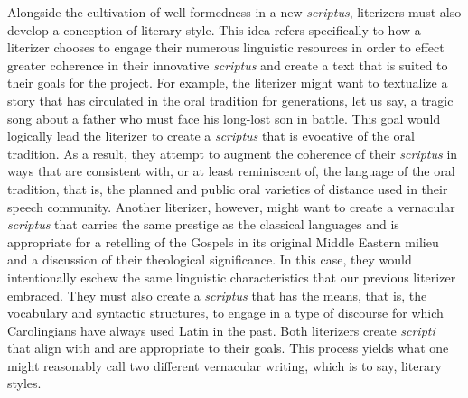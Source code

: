 Alongside the cultivation of well-formedness in a new \textit{scriptus}, literizers must also develop a conception of literary style. This idea refers specifically to how a literizer chooses to engage their numerous linguistic resources in order to effect greater coherence in their innovative \textit{scriptus} and create a text that is suited to their goals for the project. For example, the literizer might want to textualize a story that has circulated in the oral tradition for generations, let us say, a tragic song about a father who must face his long-lost son in battle. This goal would logically lead the literizer to create a \textit{scriptus} that is evocative of the oral tradition. As a result, they attempt to augment the coherence of their \textit{scriptus} in ways that are consistent with, or at least reminiscent of, the language of the oral tradition, that is, the planned and public oral varieties of distance used in their speech community. Another literizer, however, might want to create a vernacular \textit{scriptus} that carries the same prestige as the classical languages and is appropriate for a retelling of the Gospels in its original Middle Eastern milieu and a discussion of their theological significance. In this case, they would intentionally eschew the same linguistic characteristics that our previous literizer embraced. They must also create a \textit{scriptus} that has the means, that is, the vocabulary and syntactic structures, to engage in a type of discourse for which Carolingians have always used Latin in the past. Both literizers create \textit{scripti} that align with and are appropriate to their goals. This process yields what one might reasonably call two different vernacular writing, which is to say, literary styles. 

